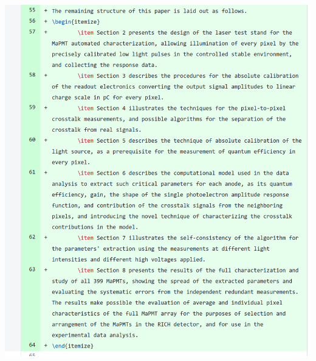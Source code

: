\documentclass[11pt]{report}
\begin{document}
\includegraphics[width=\linewidth]{round1/add1.png}
\end{document}
